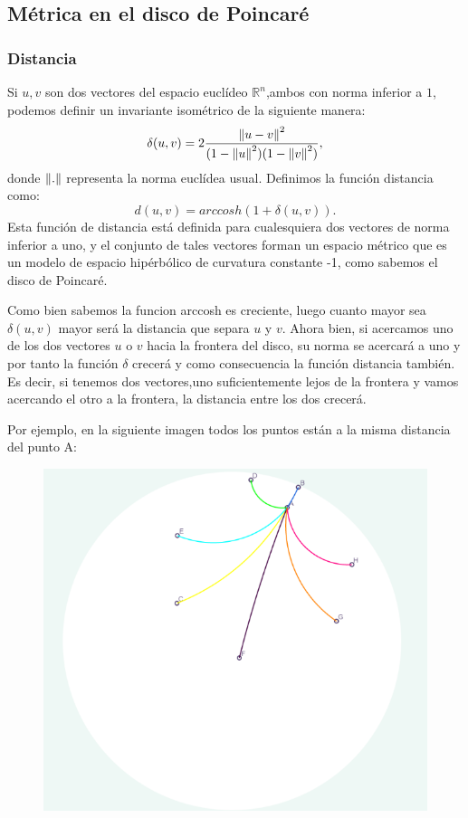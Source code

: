 \documentclass{article}
\theoremstyle{plain}
\theoremstyle{definition}
\theoremstyle{remark}
\newcommand{\norm}[1]{\ensuremath\left\Vert #1 \right\Vert}
\begin{document}
\subsection{Métrica en el disco de Poincaré}

\subsubsection{Distancia}
Si $u,v$ son dos vectores del espacio euclídeo $\mathbb{R}^n$,ambos
con norma inferior a $1$, podemos definir un invariante isométrico de
la siguiente manera:
$$\delta (u,v)=2\frac{\norm{u-v}^2}{(1-\norm{u}^2)(1-\norm{v}^2)} ,$$
donde $\norm{.}$ representa la norma euclídea usual. Definimos la
función distancia como: $$d(u,v)=arccosh(1+\delta(u,v)).$$ Esta
función de distancia está definida para cualesquiera dos vectores de
norma inferior a uno, y el conjunto de tales vectores forman un
espacio métrico que es un modelo de espacio hipérbólico de curvatura
constante -1, como sabemos el disco de Poincaré.

Como bien sabemos la funcion arccosh es creciente, luego cuanto mayor
sea $\delta (u,v)$ mayor será la distancia que separa $u$ y $v$. Ahora
bien, si acercamos uno de los dos vectores $u$ o $v$ hacia la frontera
del disco, su norma se acercará a uno y por tanto la función $\delta$
crecerá y como consecuencia la función distancia también. Es decir, si
tenemos dos vectores,uno suficientemente lejos de la frontera y vamos
acercando el otro a la frontera, la distancia entre los dos crecerá.

\newpage

Por ejemplo, en la siguiente imagen todos los puntos están a la misma
distancia del punto A:

\begin{figure}[h]
\includegraphics{Distancias.png}
\end{figure}
\end{document}
